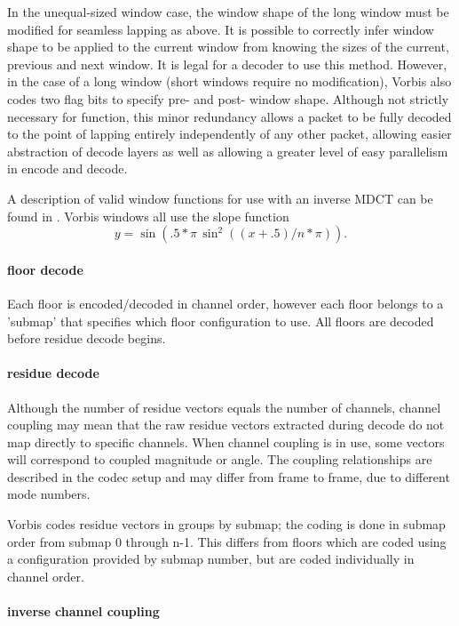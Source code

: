 In the unequal-sized window case, the window shape of the long window
must be modified for seamless lapping as above.  It is possible to
correctly infer window shape to be applied to the current window from
knowing the sizes of the current, previous and next window.  It is
legal for a decoder to use this method. However, in the case of a long
window (short windows require no modification), Vorbis also codes two
flag bits to specify pre- and post- window shape.  Although not
strictly necessary for function, this minor redundancy allows a packet
to be fully decoded to the point of lapping entirely independently of
any other packet, allowing easier abstraction of decode layers as well
as allowing a greater level of easy parallelism in encode and
decode.

A description of valid window functions for use with an inverse MDCT
can be found in \cite{Sporer/Brandenburg/Edler}.  Vorbis windows
all use the slope function
\[ y = \sin(.5*\pi \, \sin^2((x+.5)/n*\pi)) . \]



\paragraph{floor decode}
Each floor is encoded/decoded in channel order, however each floor
belongs to a 'submap' that specifies which floor configuration to
use.  All floors are decoded before residue decode begins.


\paragraph{residue decode}

Although the number of residue vectors equals the number of channels,
channel coupling may mean that the raw residue vectors extracted
during decode do not map directly to specific channels.  When channel
coupling is in use, some vectors will correspond to coupled magnitude
or angle.  The coupling relationships are described in the codec setup
and may differ from frame to frame, due to different mode numbers.

Vorbis codes residue vectors in groups by submap; the coding is done
in submap order from submap 0 through n-1.  This differs from floors
which are coded using a configuration provided by submap number, but
are coded individually in channel order.



\paragraph{inverse channel coupling}

